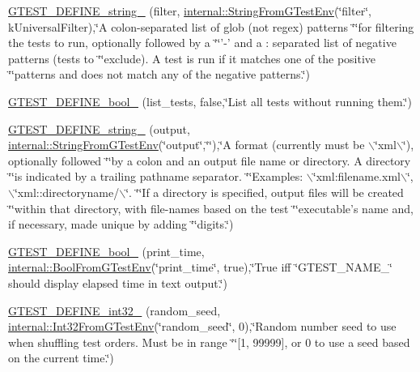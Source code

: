 \begin{DoxyCompactItemize}
\item 
\hyperlink{namespacetesting_a7707345ca1fd050c4ae9d3315fe175b7}{\-G\-T\-E\-S\-T\-\_\-\-D\-E\-F\-I\-N\-E\-\_\-string\-\_\-} (filter, \hyperlink{namespacetesting_1_1internal_a0154be115eea16783f82d3642ff27940}{internal\-::\-String\-From\-G\-Test\-Env}(\char`\"{}filter\char`\"{}, k\-Universal\-Filter),\char`\"{}\-A colon-\/separated list of glob (not regex) patterns \char`\"{}\char`\"{}for filtering the tests to run, optionally followed by a \char`\"{}\char`\"{}'-\/' and a \-: separated list of negative patterns (tests to \char`\"{}\char`\"{}exclude).  \-A test is run if it matches one of the positive \char`\"{}\char`\"{}patterns and does not match any of the negative patterns.\char`\"{})
\item 
\hyperlink{namespacetesting_a3d8df49ecaf4f410df3f89fab8ad0271}{\-G\-T\-E\-S\-T\-\_\-\-D\-E\-F\-I\-N\-E\-\_\-bool\-\_\-} (list\-\_\-tests, false,\char`\"{}\-List all tests without running them.\char`\"{})
\item 
\hyperlink{namespacetesting_a94af6ef4c969db54d3e40f42328eb753}{\-G\-T\-E\-S\-T\-\_\-\-D\-E\-F\-I\-N\-E\-\_\-string\-\_\-} (output, \hyperlink{namespacetesting_1_1internal_a0154be115eea16783f82d3642ff27940}{internal\-::\-String\-From\-G\-Test\-Env}(\char`\"{}output\char`\"{},\char`\"{}\char`\"{}),\char`\"{}\-A format (currently must be $\backslash$\char`\"{}xml$\backslash$\char`\"{}), optionally followed \char`\"{}\char`\"{}by a colon and an output file name or directory. \-A directory \char`\"{}\char`\"{}is indicated by a trailing pathname separator. \char`\"{}\char`\"{}\-Examples\-: $\backslash$\char`\"{}xml\-:filename.\-xml$\backslash$\char`\"{}, $\backslash$\char`\"{}xml\-::directoryname/$\backslash$\char`\"{}. \char`\"{}\char`\"{}\-If a directory is specified, output files will be created \char`\"{}\char`\"{}within that directory, with file-\/names based on the test \char`\"{}\char`\"{}executable's name and, if necessary, made unique by adding \char`\"{}\char`\"{}digits.\char`\"{})
\item 
\hyperlink{namespacetesting_a61406b2044994025d72ae8ef8b5122fc}{\-G\-T\-E\-S\-T\-\_\-\-D\-E\-F\-I\-N\-E\-\_\-bool\-\_\-} (print\-\_\-time, \hyperlink{namespacetesting_1_1internal_af17bf74326e1076c47455ef2618c1a1a}{internal\-::\-Bool\-From\-G\-Test\-Env}(\char`\"{}print\-\_\-time\char`\"{}, true),\char`\"{}\-True iff \char`\"{}\-G\-T\-E\-S\-T\-\_\-\-N\-A\-M\-E\-\_\-\char`\"{} should display elapsed time in text output.\char`\"{})
\item 
\hyperlink{namespacetesting_a61bb802d0fec79227ae5d0d57d6d0960}{\-G\-T\-E\-S\-T\-\_\-\-D\-E\-F\-I\-N\-E\-\_\-int32\-\_\-} (random\-\_\-seed, \hyperlink{namespacetesting_1_1internal_a960e275ac93c373f223887e57ec54381}{internal\-::\-Int32\-From\-G\-Test\-Env}(\char`\"{}random\-\_\-seed\char`\"{}, 0),\char`\"{}\-Random number seed to use when shuffling test orders.  \-Must be in range \char`\"{}\char`\"{}\mbox{[}1, 99999\mbox{]}, or 0 to use a seed based on the current time.\char`\"{})

\end{DoxyCompactItemize}
